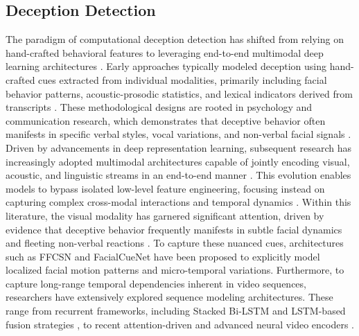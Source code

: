 \documentclass[sigconf,screen,review,anonymous]{acmart}
\begin{document}
\subsection{Deception Detection}
The paradigm of computational deception detection has shifted from relying on hand-crafted behavioral features to leveraging end-to-end multimodal deep learning architectures \cite{abouelenien2014deception, perez2015deception, guo2023audio}. Early approaches typically modeled deception using hand-crafted cues extracted from individual modalities, primarily including facial behavior patterns, acoustic-prosodic statistics, and lexical indicators derived from transcripts \cite{abouelenien2014deception, levitan2018acoustic, rill2019high}. These methodological designs are rooted in psychology and communication research, which demonstrates that deceptive behavior often manifests in specific verbal styles, vocal variations, and non-verbal facial signals \cite{buller1996interpersonal, ekman2009telling, vrij2019reading}. 
Driven by advancements in deep representation learning, subsequent research has increasingly adopted multimodal architectures capable of jointly encoding visual, acoustic, and linguistic streams in an end-to-end manner \cite{gogate2017deep, wu2018deception, guo2023audio}. This evolution enables models to bypass isolated low-level feature engineering, focusing instead on capturing complex cross-modal interactions and temporal dynamics \cite{wu2018deception, guo2023audio, uskaikar2024multi}.
Within this literature, the visual modality has garnered significant attention, driven by evidence that deceptive behavior frequently manifests in subtle facial dynamics and fleeting non-verbal reactions \cite{ekman2009telling, ding2019face, nam2023facialcuenet}. To capture these nuanced cues, architectures such as FFCSN \cite{ding2019face} and FacialCueNet \cite{nam2023facialcuenet} have been proposed to explicitly model localized facial motion patterns and micro-temporal variations. Furthermore, to capture long-range temporal dependencies inherent in video sequences, researchers have extensively explored sequence modeling architectures. These range from recurrent frameworks, including Stacked Bi-LSTM \cite{sehrawat2023deception} and LSTM-based fusion strategies \cite{bahaa2024advancing}, to recent attention-driven and advanced neural video encoders \cite{zhuo2024video, ahmed2025deception}.
\end{document}
